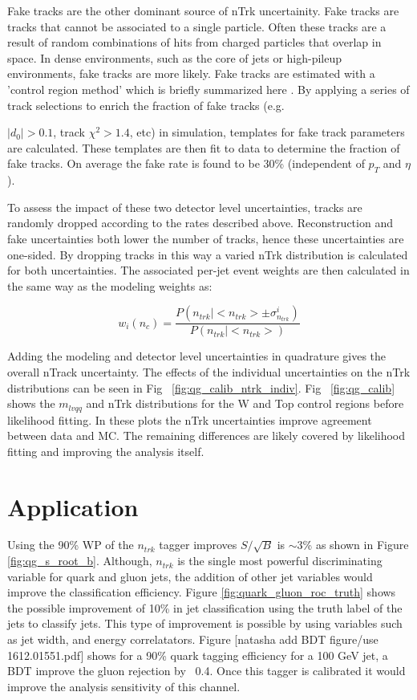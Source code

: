 Fake tracks are the other dominant source of nTrk uncertainity. Fake tracks are tracks that cannot be associated to a single particle. Often these tracks are a result of random combinations of hits from charged particles that overlap in space. In dense environments, such as the core of jets or high-pileup environments, fake tracks are more likely. Fake tracks are estimated with a 'control region method' which is briefly summarized here \cite{FakeTracks}. By applying a series of track selections to enrich the fraction of fake tracks (e.g. {$|d_{0}| > 0.1$, track $\chi^{2}>1.4$, etc) in simulation, templates for fake track parameters are calculated. These templates are then fit to data to determine the fraction of fake tracks. On average the fake rate is found to be 30\% (independent of $p_{T}$ and $\eta$).

To assess the impact of these two detector level uncertainties, tracks are randomly dropped according to the rates described above. Reconstruction and fake uncertainties both lower the number of tracks, hence these uncertainties are one-sided. By dropping tracks in this way a varied nTrk distribution is calculated for both uncertainties. The associated per-jet event weights are then calculated in the same way as the modeling weights as:

\begin{equation}
w_{i}(n_{c}) = \frac{P(n_{trk}|<n_{trk}> \pm \sigma^{i}_{n_{trk}})} {P(n_{trk}|<n_{trk}>)}
\end{equation}


Adding the modeling and detector level uncertainties in quadrature gives the overall nTrack uncertainty. The effects of the individual uncertainties on the nTrk distributions can be seen in Fig ~\ref{fig:qg_calib_ntrk_indiv}. Fig ~\ref{fig:qg_calib} shows the $m_{lvqq}$ and nTrk distributions for the W and Top control regions before likelihood fitting. In these plots the nTrk uncertainties improve agreement between data and MC. The remaining differences are likely covered by likelihood fitting and improving the analysis itself.  

\chapter{Application}
Using the 90\% WP of the $n_{trk}$ tagger improves $S/\sqrt{B}$ is $\sim 3$\% as shown in Figure \ref{fig:qg_s_root_b}. Although, $n_{trk}$ is the single most powerful discriminating variable for quark and gluon jets, the addition of other jet variables would improve the classification efficiency. Figure \ref{fig:quark_gluon_roc_truth} shows the possible improvement of 10\%  in jet classification using the truth label of the jets to classify jets.  This type of improvement is possible by using variables such as jet width, and energy correlatators. Figure [natasha add BDT figure/use 1612.01551.pdf] shows for a 90\% quark tagging efficiency for a 100 GeV jet, a BDT improve the gluon rejection by ~0.4. Once this tagger is calibrated it would improve the analysis sensitivity of this channel.






}
